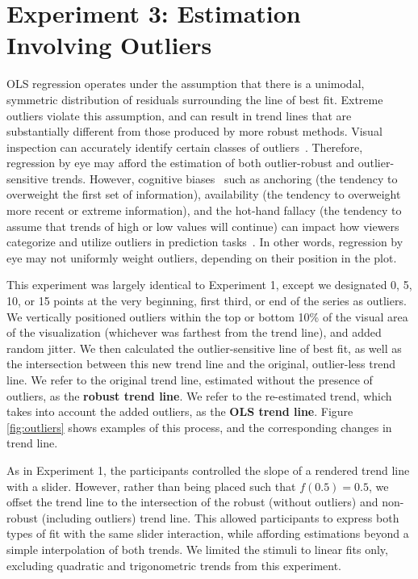 \documentclass{sigchi}
\begin{document}
\section{Experiment 3: Estimation Involving Outliers}

\outlierFig

\outliersFig


OLS regression operates under the assumption that there is a unimodal, symmetric distribution of residuals surrounding the line of best fit. Extreme outliers violate this assumption, and can result in trend lines that are substantially different from those produced by more robust methods. Visual inspection can accurately identify certain classes of outliers~\cite{albers2014task}. Therefore, regression by eye may afford the estimation of both outlier-robust and outlier-sensitive trends. However, cognitive biases~\cite{tversky1975judgment} such as anchoring (the tendency to overweight the first set of information), availability (the tendency to overweight more recent or extreme information), and the hot-hand fallacy (the tendency to assume that trends of high or low values will continue) can impact how viewers categorize and utilize outliers in prediction tasks~\cite{campbell2009anchoring, ji2001culture}. In other words, regression by eye may not uniformly weight outliers, depending on their position in the plot.

This experiment was largely identical to Experiment 1, except we designated 0, 5, 10, or 15 points at the very beginning, first third, or end of the series as outliers. We vertically positioned outliers within the top or bottom 10\% of the visual area of the visualization (whichever was farthest from the trend line), and added random jitter. We then calculated the outlier-sensitive line of best fit, as well as the intersection between this new trend line and the original, outlier-less trend line. We refer to the original trend line, estimated without the presence of outliers, as the \textbf{robust trend line}. We refer to the re-estimated trend, which takes into account the added outliers, as the \textbf{OLS trend line}. Figure \ref{fig:outliers} shows examples of this process, and the corresponding changes in trend line.

As in Experiment 1, the participants controlled the slope of a rendered trend line with a slider. However, rather than being placed such that $f(0.5)=0.5$, we offset the trend line to the intersection of the robust (without outliers) and non-robust (including outliers) trend line. This allowed participants to express both types of fit with the same slider interaction, while affording estimations beyond a simple interpolation of both trends. We limited the stimuli to linear fits only, excluding quadratic and trigonometric trends from this experiment.
\end{document}
